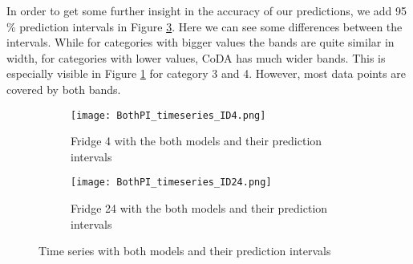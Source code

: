 In order to get some further insight in the accuracy of our predictions, we add 95 \% prediction intervals in Figure \ref{fig:TS BothPI}. Here we can see some differences between the intervals. While for categories with bigger values the bands are quite similar in width, for categories with lower values, CoDA has much wider bands. This is especially visible in Figure \ref{fig:BothPI Fridge 4} for category 3 and 4. However, most data points are covered by both bands.
\begin{figure}[htb!]
\centering
\begin{subfigure}[b]{0.8\textwidth}
\texttt{[image: BothPI\_timeseries\_ID4.png]}
\caption{Fridge 4 with the both models and their prediction intervals}
\label{fig:BothPI Fridge 4}
\end{subfigure}
\hfill
\begin{subfigure}[b]{0.8\textwidth}
\texttt{[image: BothPI\_timeseries\_ID24.png]}
\caption{Fridge 24 with the both models and their prediction intervals}
\label{fig:BothPI Fridge 24}
\end{subfigure}
\caption{Time series with both models and their prediction intervals}
\label{fig:TS BothPI}
\end{figure}